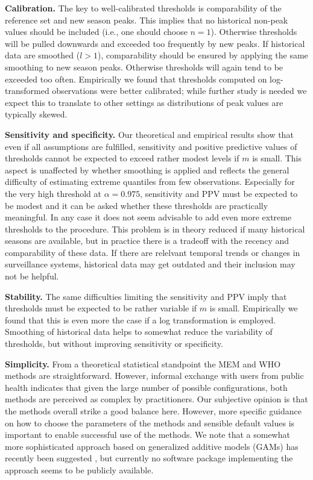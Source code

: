 \documentclass{article}
\begin{document}
\begin{description}
\item \textbf{Calibration.} The key to well-calibrated thresholds is comparability of the reference set and new season peaks. This implies that no historical non-peak values should be included (i.e., one should choose $n = 1$). Otherwise thresholds will be pulled downwards and exceeded too frequently by new peaks. If historical data are smoothed ($l > 1$), comparability should be ensured by applying the same smoothing to new season peaks. Otherwise thresholds will again tend to be exceeded too often. Empirically we found that thresholds computed on log-transformed observations were better calibrated; while further study is needed we expect this to translate to other settings as distributions of peak values are typically skewed.
\item \textbf{Sensitivity and specificity.} Our theoretical and empirical results show that even if all assumptions are fulfilled, sensitivity and positive predictive values of thresholds cannot be expected to exceed rather modest levels if $m$ is small. This aspect is unaffected by whether smoothing is applied and reflects the general difficulty of estimating extreme quantiles from few observations. Especially for the very high threshold at $\alpha = 0.975$, sensitivity and PPV must be expected to be modest and it can be asked whether these thresholds are practically meaningful. In any case it does not seem advisable to add even more extreme thresholds to the procedure. This problem is in theory reduced if many historical seasons are available, but in practice there is a tradeoff with the recency and comparability of these data. If there are relelvant temporal trends or changes in surveillance systems, historical data may get outdated and their inclusion may not be helpful.
\item \textbf{Stability.} The same difficulties limiting the sensitivity and PPV imply that thresholds must be expected to be rather variable if $m$ is small. Empirically we found that this is even more the case if a log transformation is employed. Smoothing of historical data helps to somewhat reduce the variability of thresholds, but without improving sensitivity or specificity.
\item \textbf{Simplicity.} From a theoretical statistical standpoint the MEM and WHO methods are straightforward. However, informal exchange with users from public health indicates that given the large number of possible configurations, both methods are perceived as complex by practitioners. Our subjective opinion is that the methods overall strike a good balance here. However, more specific guidance on how to choose the parameters of the methods and sensible default values is important to enable successful use of the methods. We note that a somewhat more sophisticated approach based on generalized additive models (GAMs) has recently been suggested \citep{Pang2023}, but currently no software package implementing the approach seems to be publicly available.

\end{description}
\end{document}
